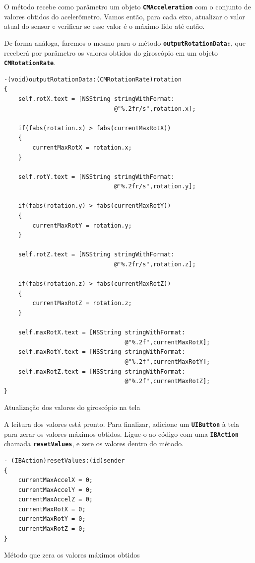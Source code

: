 \documentclass[a4paper,12pt,brazil,doubleside]{book}
\begin{document}
\begin{singlespace}
O método recebe como parâmetro um objeto \texttt{\textbf{CMAcceleration}} com o conjunto de valores obtidos do acelerômetro. Vamos então, para cada eixo, atualizar o valor atual do sensor e verificar se esse valor é o máximo lido até então.

De forma análoga, faremos o mesmo para o método \texttt{\textbf{outputRotationData:}}, que receberá por parâmetro os valores obtidos do giroscópio em um objeto \texttt{\textbf{CMRotationRate}}.

\begin{listing}[H]
\begin{verbatim}
-(void)outputRotationData:(CMRotationRate)rotation
{
    self.rotX.text = [NSString stringWithFormat:
                               @"%.2fr/s",rotation.x];
    
    if(fabs(rotation.x) > fabs(currentMaxRotX))
    {
        currentMaxRotX = rotation.x;
    }
    
    self.rotY.text = [NSString stringWithFormat:
                               @"%.2fr/s",rotation.y];
    
    if(fabs(rotation.y) > fabs(currentMaxRotY))
    {
        currentMaxRotY = rotation.y;
    }
    
    self.rotZ.text = [NSString stringWithFormat:
                               @"%.2fr/s",rotation.z];
    
    if(fabs(rotation.z) > fabs(currentMaxRotZ))
    {
        currentMaxRotZ = rotation.z;
    }
    
    self.maxRotX.text = [NSString stringWithFormat:
                                  @"%.2f",currentMaxRotX];
    self.maxRotY.text = [NSString stringWithFormat:
                                  @"%.2f",currentMaxRotY];
    self.maxRotZ.text = [NSString stringWithFormat:
                                  @"%.2f",currentMaxRotZ];
}
\end{verbatim}
\caption{Atualização dos valores do giroscópio na tela}
\end{listing}


A leitura dos valores está pronto. Para finalizar, adicione um \texttt{\textbf{UIButton}} à tela para zerar os valores máximos obtidos. Ligue-o ao código com uma \texttt{\textbf{IBAction}} chamada \texttt{\textbf{resetValues}}, e zere os valores dentro do método.

\begin{listing}[H]
\begin{verbatim}
- (IBAction)resetValues:(id)sender
{
    currentMaxAccelX = 0;
    currentMaxAccelY = 0;
    currentMaxAccelZ = 0;
    currentMaxRotX = 0;
    currentMaxRotY = 0;
    currentMaxRotZ = 0;
}
\end{verbatim}
\caption{Método que zera os valores máximos obtidos}
\end{listing}


\end{singlespace}
\end{document}
